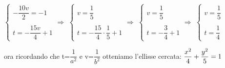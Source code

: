 \begin{esempio}
\vspace{6pt}
$\begin{cases}  -\dfrac{10v}{2} =-1 \\  \\ t=-\dfrac{15v}{4} +1  
\end{cases} \Rightarrow$
$\begin{cases}  v =\dfrac{1}{5}  \\ \\ t=-\dfrac{15}{4}\cdot\dfrac{1}{5} +1  
\end{cases} \Rightarrow$
$\begin{cases}  v =\dfrac{1}{5}  \\ \\ t=-\dfrac{3}{4} +1  
\end{cases} \Rightarrow$
$\begin{cases}  v =\dfrac{1}{5} \\  \\ t=\dfrac{1}{4}  
\end{cases}$

\vspace{6pt}
ora ricordando che t=$\dfrac{1}{a^{2}}$ e v=$\dfrac{1}{b^{2}}$
otteniamo l'ellisse cercata: 
$ \vspace{2cm} \dfrac{x^{2}}{4} + \dfrac{y^{2}}{5} = 1$
\end{esempio}

